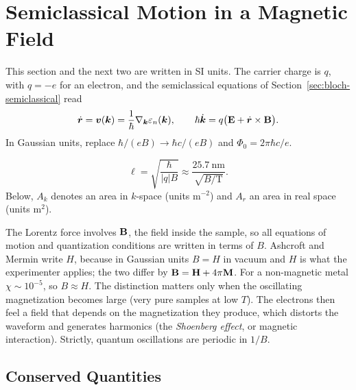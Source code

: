 \section{Semiclassical Motion in a Magnetic Field}
\label{sec:bloch-magnetic}

This section and the next two are written in SI units. The carrier charge is $q$, with $q = -e$ for an electron, and the semiclassical equations of Section~\ref{sec:bloch-semiclassical} read
\begin{equation}
    \dot{\lvect{r}} = \lvect{v}(\lvect{k}) = \frac{1}{\hbar}\nabla_{\lvect{k}}\varepsilon_n(\lvect{k}),
    \qquad
    \hbar\dot{\lvect{k}} = q\bigl(\cvect{E} + \dot{\lvect{r}}\times\cvect{B}\bigr).
\end{equation}
In Gaussian units, replace $\hbar/(eB)\to\hbar c/(eB)$ and $\Phi_0 = 2\pi\hbar c/e$.

\begin{definition}
\begin{equation}
    \ell = \sqrt{\frac{\hbar}{|q|B}} \approx \frac{25.7\ \text{nm}}{\sqrt{B/\text{T}}}.
\end{equation}
Below, $A_k$ denotes an area in $k$-space (units m$^{-2}$) and $A_r$ an area in real space (units m$^2$).
\end{definition}

\begin{fact}[$B$ or $H$?]
The Lorentz force involves $\cvect{B}$, the field inside the sample, so all equations of motion and quantization conditions are written in terms of $B$. Ashcroft and Mermin write $H$, because in Gaussian units $B = H$ in vacuum and $H$ is what the experimenter applies; the two differ by $\cvect{B} = \cvect{H} + 4\pi\cvect{M}$. For a non-magnetic metal $\chi\sim10^{-5}$, so $B\approx H$. The distinction matters only when the oscillating magnetization becomes large (very pure samples at low $T$). The electrons then feel a field that depends on the magnetization they produce, which distorts the waveform and generates harmonics (the \emph{Shoenberg effect}, or magnetic interaction). Strictly, quantum oscillations are periodic in $1/B$.
\end{fact}

\subsection{Conserved Quantities}

